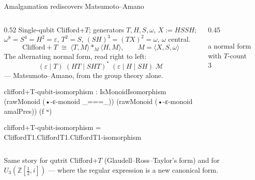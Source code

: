 \begin{frame}{Amalgamation rediscovers Matsumoto--Amano}
\begin{columns}[c]
\begin{column}{0.52\textwidth}
\footnotesize Single-qubit Clifford+$T$; generators $T,H,S,\omega$, $X := HSSH$;
$\omega^8 = S^4 = H^2 = \varepsilon$, $T^2 = S$, $(SH)^3 = (TX)^2 = \omega$,
$\omega$ central.
\small
\[
  \text{Clifford}{+}T \;\cong\; \langle T, M\rangle \ast_M \langle H, M\rangle,
  \qquad M = \langle X, S, \omega\rangle
\]
The alternating normal form, read right to left:
\[
  (\varepsilon\mid T)\;(HT\mid SHT)^{*}\;(\varepsilon\mid H\mid SH)\;\mathcal{M}
\]
--- \alert{Matsumoto--Amano}, from the group theory alone.
\renewcommand{\AgdaCodeStyle}{\scriptsize}
\begin{code}
clifford+T-qubit-isomorphism : IsMonoidIsomorphism
  (rawMonoid (•-ε-monoid _===_)) (rawMonoid (•-ε-monoid amalPres)) (f ʷ)
\end{code}
\begin{code}[hide]
clifford+T-qubit-isomorphism = CliffordT1.CliffordT1.CliffordT1-isomorphism
\end{code}
\end{column}
\begin{column}{0.45\textwidth}
\centering
{}

\vspace{3pt}

{\scriptsize a normal form with $T$-count 3}
\end{column}
\end{columns}
\vspace{4pt}
{\small Same story for qutrit Clifford+$T$ (Glaudell--Ross--Taylor's form) and for
$U_3(\mathbb{Z}[\frac12,i])$ --- where the regular expression is a \alert{new}
canonical form.}
\end{frame}
